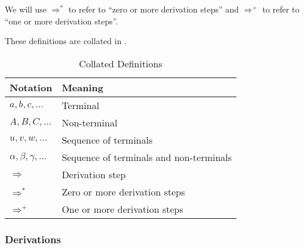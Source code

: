 
We will use $\Rightarrow^{*}$ to refer to ``zero or more derivation steps'' and $\Rightarrow^{+}$ to refer to ``one or more derivation steps''.

These definitions are collated in .

\begin{table}[]
    \centering
    \begin{tabular}{l|l}
        \textbf{Notation} & \textbf{Meaning} \\ \hline
        $a, b, c, \ldots$ & Terminal \\
        $A, B, C, \ldots$ & Non-terminal \\
        $u, v, w, \ldots$ & Sequence of terminals \\
        $\alpha, \beta, \gamma, \ldots$ & Sequence of terminals and non-terminals \\
        $\Rightarrow$ & Derivation step\\
        $\Rightarrow^{*}$ & Zero or more derivation steps\\
        $\Rightarrow^{+}$ & One or more derivation steps
    \end{tabular}
    \caption{Collated Definitions}
    \label{tab:par-collated-notation}
\end{table}



\subsubsection{Derivations}
\newcommand{\selectedNonTerminal}[1]{{\tcbox{\textbf{\textsf{\textcolor{white}{#1}}}}}}
\newcommand{\nonterminal}[1]{{\textbf{\textsf{\textcolor{nonterminal}{#1}}}}}


